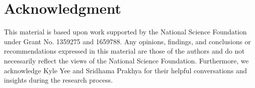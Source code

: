 \documentclass[10pt,twocolumn,letterpaper]{article}
\begin{document}

\section*{Acknowledgment}


This material is based upon work supported by the National
Science  Foundation  under  Grant  No. 1359275  and  1659788. Any  opinions,  findings,  and  conclusions  or  recommendations expressed in this material are those of the authors
and do not necessarily reflect the views of the National Science
Foundation.
Furthermore,  we  acknowledge Kyle Yee and Sridhama Prakhya for their helpful conversations and insights during the
research process.







%
%


% 
\end{document}
